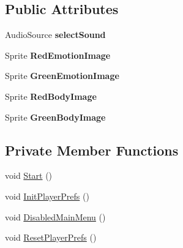 \subsection*{Public Attributes}
\begin{DoxyCompactItemize}
\item 
\mbox{\label{class_main_menu_controller_a5c0fe7d77c251451784e18f4aa6cf1b0}} 
Audio\+Source {\bfseries select\+Sound}
\item 
\mbox{\label{class_main_menu_controller_a3deccdff61e0d0c07187646b2469abe0}} 
Sprite {\bfseries Red\+Emotion\+Image}
\item 
\mbox{\label{class_main_menu_controller_ab806db9384126b08f5115e3e11e8b955}} 
Sprite {\bfseries Green\+Emotion\+Image}
\item 
\mbox{\label{class_main_menu_controller_a4faf5362df73ac355ebff852555dfb86}} 
Sprite {\bfseries Red\+Body\+Image}
\item 
\mbox{\label{class_main_menu_controller_ac826951bfde26e1454ba8759351b96df}} 
Sprite {\bfseries Green\+Body\+Image}
\end{DoxyCompactItemize}
\subsection*{Private Member Functions}
\begin{DoxyCompactItemize}
\item 
void \mbox{\hyperlink{class_main_menu_controller_a732c505767ad16e6f4726f0e9643fa8a}{Start}} ()
\item 
void \mbox{\hyperlink{class_main_menu_controller_a45a5d679a64a932a658fcf0c88c722c7}{Init\+Player\+Prefs}} ()
\item 
void \mbox{\hyperlink{class_main_menu_controller_ae525a96b1b6f2f3c39cf48fbe6e820bd}{Disabled\+Main\+Menu}} ()
\item 
void \mbox{\hyperlink{class_main_menu_controller_a71ba493b5847db8032f3d922c367ff2f}{Reset\+Player\+Prefs}} ()
\end{DoxyCompactItemize}
